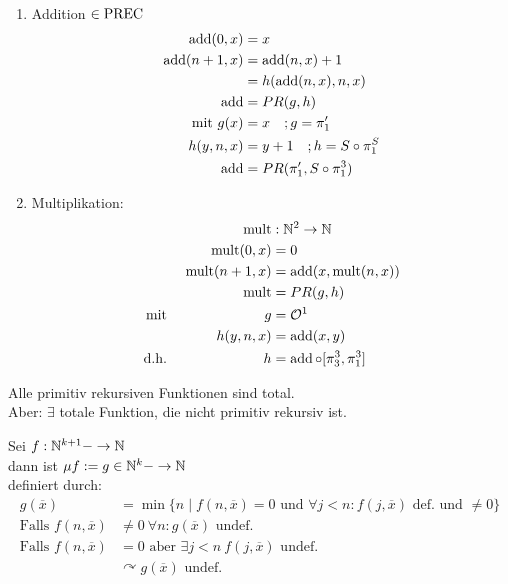 \begin{Bsp*}\
	\begin{enumerate}
	\item Addition $\in\operatorname{PREC}$
		\begin{align*}
			\operatorname{add}(0,x) &=x\\
			\operatorname{add}(n+1,x) &= \operatorname{add}(n,x)+1\\
			&= h(\operatorname{add}(n,x),n,x)\\
			\operatorname{add} &= PR(g,h)\\
			\text{mit }g(x) &= x \quad ; g=\pi'_1\\
			h(y,n,x) &= y+1 \quad ; h= S\circ \pi^S_1\\
			\operatorname{add} &= PR(\pi'_1,S\circ\pi^3_1)
		\end{align*}
	\item Multiplikation:
		\begin{alignat*}{2}
			&&\mult&: \N^2\->\N\\
			&&\mult(0,x) &=0\\
			&&\mult(n+1,x) &= \add(x,\mult(n,x))\\
			&&\mult &= PR(g,h)\\
			\text{mit}&\ & g&= \mathcal{O}^1\\
			&&h(y,n,x) &= \add(x,y)\\
			\text{d.h.}&& h &=\add\circ[\pi^3_3,\pi^3_1]
		\end{alignat*}
	\end{enumerate}
\end{Bsp*}
\begin{Beobachtung}
	Alle primitiv rekursiven Funktionen sind total.\\
	Aber: $\exists$ totale Funktion, die nicht primitiv rekursiv ist.
\end{Beobachtung}
\begin{Def}[Minimierung]\label{def:Minimierung}
	Sei $f:\N^{k+1}-\->\N$\\
	dann ist $\mu f:= g\in\N^k-\->\N$\\
	definiert durch:
	\begin{align*}
		g(\overline{x}) &= \min\{n \mid f(n,\overline{x})=0\text{ und }\forall j<n: f(j,\overline{x})\text{ def. und }\neq 0\} \tag*{\qedhere}\\[.5em]
		\text{Falls }f(n,\overline{x}) &\neq 0\ \forall n: g(\overline{x})\text{ undef.}\\
		\text{Falls }f(n,\overline{x}) &=0\text{ aber }\exists j< n\ f(j,\overline{x})\text{ undef.}\\
		&\curvearrowright g(\overline{x})\text{ undef.}
	\end{align*}
\end{Def}
